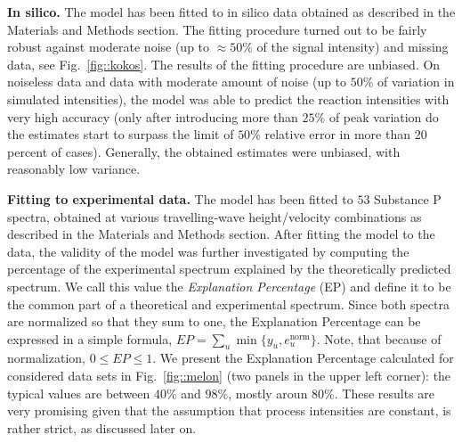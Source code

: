 \documentclass{llncs}
\begin{document}
\textbf{In silico.} The model has been fitted to in silico data obtained as described in the Materials and Methods section. The fitting procedure turned out to be fairly robust against moderate noise (up to $ \approx 50\%$ of the signal intensity) and missing data, see Fig.~\ref{fig::kokos}. The results of the fitting procedure are unbiased. On noiseless data and data with moderate amount of noise (up to $50\%$ of variation in simulated intensities), the model was able to predict the reaction intensities with very high accuracy (only after introducing more than $25\%$ of peak variation do the estimates start to surpass the limit of $50\%$ relative error in more than 20 percent of cases). Generally, the obtained estimates were unbiased, with reasonably low variance.

\textbf{Fitting to experimental data.} The model has been fitted to $53$ Substance P spectra, obtained at various travelling-wave height/velocity combinations as described in the Materials and Methods section. After fitting the model to the data, the validity of the model was further investigated by computing the percentage of the experimental spectrum explained by the theoretically predicted spectrum. We call this value the \textit{Explanation Percentage} (EP) and define it to be the common part of a theoretical and experimental spectrum. Since both spectra are normalized so that they sum to one, the Explanation Percentage can be expressed in a simple formula,
$ EP = \sum_u \min\{y_u, e_u^\text{norm}\}.$
Note, that because of normalization, $0 \leq EP \leq 1$. We present the Explanation Percentage calculated for considered data sets in Fig.~\ref{fig::melon} (two panels in the upper left corner): the typical values are between $40\%$ and $98\%$, mostly aroun $80\%$. These results are very promising given that the assumption that process intensities are constant, is rather strict, as discussed later on.
\end{document}
